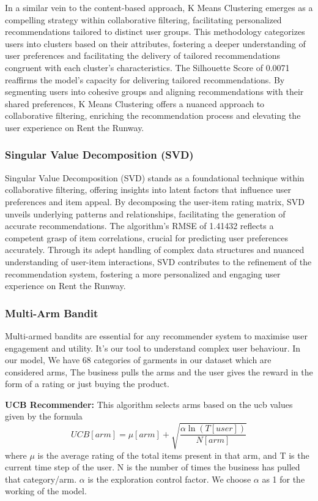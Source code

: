 \documentclass[conference]{IEEEtran}
\begin{document}
In a similar vein to the content-based approach, K Means Clustering emerges as a compelling strategy within collaborative filtering, facilitating personalized recommendations tailored to distinct user groups. This methodology categorizes users into clusters based on their attributes, fostering a deeper understanding of user preferences and facilitating the delivery of tailored recommendations congruent with each cluster's characteristics. The Silhouette Score of 0.0071 reaffirms the model's capacity for delivering tailored recommendations. By segmenting users into cohesive groups and aligning recommendations with their shared preferences, K Means Clustering offers a nuanced approach to collaborative filtering, enriching the recommendation process and elevating the user experience on Rent the Runway.

\subsubsection{Singular Value Decomposition (SVD)}

Singular Value Decomposition (SVD) stands as a foundational technique within collaborative filtering, offering insights into latent factors that influence user preferences and item appeal. By decomposing the user-item rating matrix, SVD unveils underlying patterns and relationships, facilitating the generation of accurate recommendations. The algorithm's RMSE of 1.41432 reflects a competent grasp of item correlations, crucial for predicting user preferences accurately. Through its adept handling of complex data structures and nuanced understanding of user-item interactions, SVD contributes to the refinement of the recommendation system, fostering a more personalized and engaging user experience on Rent the Runway.

\subsubsection{Multi-Arm Bandit}
Multi-armed bandits are essential for any recommender system to maximise user engagement and utility. It's our tool to understand complex user behaviour. In our model, We have 68 categories of garments in our dataset which are considered arms, The business pulls the arms and the user gives the reward in the form of a rating or just buying the product. 

\textbf{UCB Recommender:}
This algorithm selects arms based on the ucb values given by the formula 
\begin{equation}
    UCB[arm] = \mu[arm] + \sqrt{\frac{\alpha\ln(T[user])}{N[arm]}}
\end{equation}
where $\mu$ is the average rating of the total items present in that arm, and T is the current time step of the user. N is the number of times the business has pulled that category/arm. $\alpha$ is the exploration control factor. We choose $\alpha$ as 1 for the working of the model.
\end{document}
